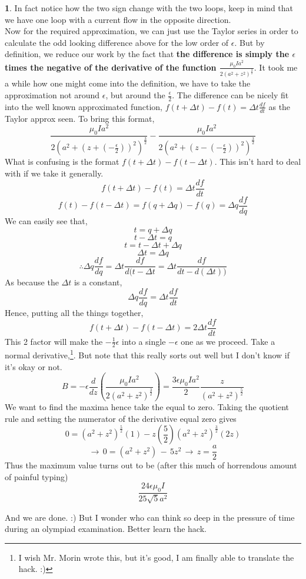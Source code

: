 \documentclass[10pt,letterpaper,twocolumn]{article}
\theoremstyle{definition}
\theoremstyle{definition}
\theoremstyle{definition}
\newtheorem{sol}{\framebox[0.07\textwidth]{Sol}}[section]
\begin{document}
\begin{sol}
In fact notice how the two sign change with the two loops, keep in mind that we have one loop with a current flow in the opposite direction. \\
Now for the required approximation, we can just  use the Taylor series in order to calculate the odd looking difference above for the low order of $\epsilon$. But by definition, we reduce our work by the fact that\textbf{ the difference is simply the $\epsilon$ times the negative of the derivative of the function $\frac{\mu_0 I a^2}{2(a^2 + z^2)^{\frac{3}{2}}}$}. It took me a while how one might come into the definition, we have to take the approximation not around $\epsilon$, but around the $\frac{\epsilon}{2}$. The difference can be nicely fit into the well known approximated function, $f(t + \Delta t) - f(t) = \Delta t \frac{df}{dt}$ as the Taylor approx seen. To bring this format,
\[
\frac{ \mu_0 I a^2} {2 ( a^2 + (z + ( - \frac{\epsilon}{2}))^2 )^{\frac{3}{2} }} -
\frac{ \mu_0 I a^2} {2 ( a^2 + (z -(- \frac{\epsilon}{2}))^2 )^{\frac{3}{2} }}
\]
What is confusing is the format $f(t + \Delta t) - f(t - \Delta t)$. This isn't hard to deal with if we take it generally.
\[
f(t + \Delta t) - f(t) = \Delta t \frac{df}{dt}\]
\[
f(t) - f(t- \Delta t) = f(q + \Delta q) - f(q) = \Delta q \frac{df}{dq} 
\]
We can easily see that,
\[ t = q + \Delta q \]
\[ t - \Delta t = q \]
\[t = t - \Delta t + \Delta q \]
\[ \Delta t = \Delta q \]
\[ \therefore \Delta q \frac{df}{dq} = \Delta t \frac{df}{d(t - \Delta t} =\Delta t \frac{df}{dt - d(\Delta t))}  \]
As because the $\Delta t$ is a constant,
\[  \Delta q \frac{df}{dq}  =   \Delta t \frac{df}{dt}   \]
Hence, putting all the things together,
\[ f(t + \Delta t ) - f(t - \Delta t) = 2 \Delta t \frac{df}{dt} \]
This 2 factor will make the $-\frac{1}{2} \epsilon$ into a single $-\epsilon$ one as we proceed. Take a normal derivative,\footnote{I wish Mr. Morin wrote this, but it's good, I am finally able to translate the hack. :)}.
But note that this really sorts out well but I don't know if it's okay or not.
\[ B = -\epsilon \frac{d}{dz} \left(           
\frac{\mu_0 I a^2}{2(a^2 + z^2)^{\frac{3}{2}}}
\right) 
=
\frac{3 \epsilon \mu_0 I a^2}{2} \frac{z}{(a^2 + z^2)^{\frac{5}{2}}}
\]
We want to find the maxima hence take the equal to zero. Taking the quotient rule and setting the numerator of the derivative equal zero gives
\[ 0 = ( a^2 + z^2)^{\frac{5}{2}} (1) - z(\frac{5}{2}) (a^2 + z^2) ^ {\frac{3}{2}} (2z)\]
\[\rightarrow \, 0= (a^2+z^2) \, - \, 5z^2 \, \rightarrow \, z = \frac{a}{2} \]
Thus the maximum value turns out to be (after this much of horrendous amount of painful typing)
\[\frac{24 \epsilon \mu_0 I}{25 \sqrt{5} a^2} \]

And we are done. :)
But I wonder who can think so deep in the pressure of time during an olympiad examination. Better learn the hack.
\end{sol}
\end{document}
